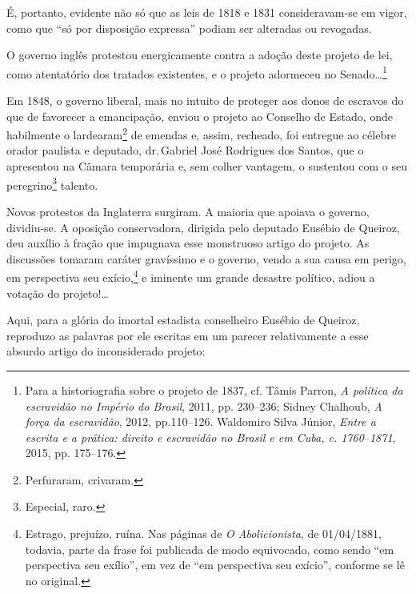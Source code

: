 É, portanto, evidente não só que as leis de 1818 e 1831 consideravam-se
em vigor, como que ``só por disposição expressa'' podiam ser alteradas ou
revogadas.

O governo inglês protestou energicamente contra a adoção deste projeto
de lei, como atentatório dos tratados existentes, e o projeto adormeceu
no Senado\ldots{}\footnote{Para a historiografia sobre o projeto de 1837,
  cf. Tâmis Parron, \emph{A política da escravidão no Império do
  Brasil}, 2011, pp. 230--236; Sidney Chalhoub, \emph{A força da
  escravidão}, 2012, pp.110--126. Waldomiro Silva Júnior, \emph{Entre a
  escrita e a prática: direito e escravidão no Brasil e em Cuba, c.
  1760--1871}, 2015, pp. 175--176.}

Em 1848, o governo liberal, mais no intuito de proteger aos donos de
escravos do que de favorecer a emancipação, enviou o projeto ao Conselho
de Estado, onde habilmente o lardearam\footnote{Perfuraram, crivaram.}
de emendas e, assim, recheado, foi entregue ao célebre orador paulista e
deputado, dr.\,Gabriel José Rodrigues dos Santos, que o apresentou na
Câmara temporária e, sem colher vantagem, o sustentou com o seu
peregrino\footnote{Especial, raro.} talento.

Novos protestos da Inglaterra surgiram. A maioria que apoiava o governo,
dividiu-se. A oposição conservadora, dirigida pelo deputado Eusébio de
Queiroz, deu auxílio à fração que impugnava esse monstruoso artigo do
projeto. As discussões tomaram caráter gravíssimo e o governo, vendo a
sua causa em perigo, em perspectiva seu exício,\footnote{Estrago,
  prejuízo, ruína. Nas páginas de \emph{O Abolicionista}, de 01/04/1881,
  todavia, parte da frase foi publicada de modo equivocado, como sendo
  ``em perspectiva seu exílio'', em vez de ``em perspectiva seu exício'',
  conforme se lê no original.} e iminente um grande desastre político,
adiou a votação do projeto!\ldots{}

Aqui, para a glória do imortal estadista conselheiro Eusébio de Queiroz,
reproduzo as palavras por ele escritas em um parecer relativamente a
esse absurdo artigo do inconsiderado projeto:

